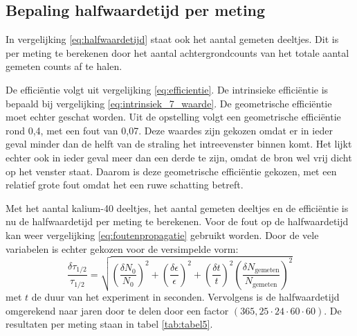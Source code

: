 \documentclass[11pt,a4paper]{article}
\begin{document}
\begin{table}
\caption{Aantal kalium-40 deeltjes per hoeveelheid .}
\centering
{}
\label{tab:tabel4}
\end{table}

\subsection{Bepaling halfwaardetijd per meting}
In vergelijking \ref{eq:halfwaardetijd} staat ook het aantal gemeten deeltjes. Dit is per meting te berekenen door het aantal achtergrondcounts van het totale aantal gemeten counts af te halen. 

De efficiëntie volgt uit vergelijking \ref{eq:efficientie}. De intrinsieke efficiëntie is bepaald bij vergelijking \ref{eq:intrinsiek_7_waarde}. De geometrische efficiëntie moet echter geschat worden. Uit de opstelling volgt een geometrische efficiëntie rond 0,4, met een fout van 0,07. Deze waardes zijn gekozen omdat er in ieder geval minder dan de helft van de straling het intreevenster binnen komt. Het lijkt echter ook in ieder geval meer dan een derde te zijn, omdat de bron wel vrij dicht op het venster staat. Daarom is deze geometrische efficiëntie gekozen, met een relatief grote fout omdat het een ruwe schatting betreft.

Met het aantal kalium-40 deeltjes, het aantal gemeten deeltjes en de efficiëntie is nu de halfwaardetijd per meting te berekenen. Voor de fout op de halfwaardetijd kan weer vergelijking \ref{eq:foutenpropagatie} gebruikt worden. Door de vele variabelen is echter gekozen voor de versimpelde vorm:
\begin{equation}
\frac{\delta \tau_{1/2}}{\tau_{1/2}} = \sqrt{(\frac{\delta N_0}{N_0})^2 + (\frac{\delta \epsilon}{\epsilon})^2 + (\frac{\delta t}{t})^2 (\frac{\delta N_\mathrm{gemeten}}{N_\mathrm{gemeten}})^2}
\label{eq:foutenpropagatie_2}
\end{equation}
met $t$ de duur van het experiment in seconden. Vervolgens is de halfwaardetijd omgerekend naar jaren door te delen door een factor $(365,25 \cdot 24 \cdot 60 \cdot 60)$. De resultaten per meting staan in tabel \ref{tab:tabel5}.
\end{document}
